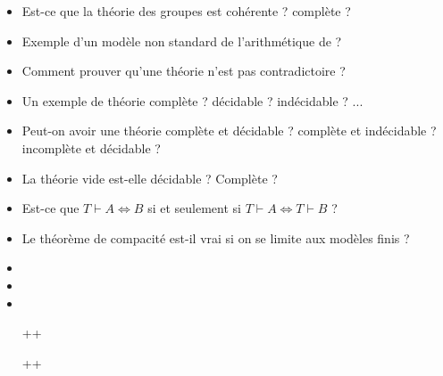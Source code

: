 \documentclass{agregfiche}
\begin{document}
\begin{itemize}
	\item Est-ce que la théorie des groupes est cohérente ? complète
	?
    \item Exemple d'un modèle non standard de l'arithmétique de
    ?
    \item Comment prouver qu'une théorie n'est pas contradictoire ?
    \item Un exemple de théorie complète ? décidable ? indécidable ?
    ...
    \item Peut-on avoir une théorie complète et décidable ? complète
    et indécidable ? incomplète et décidable ?
    \item La théorie vide est-elle décidable ? Complète ?
    \item  Est-ce que $T \vdash A \Leftrightarrow B$ si et seulement
    si $T
    \vdash A \Leftrightarrow T\vdash B$ ?
  \item Le théorème de compacité est-il vrai si on se limite aux modèles finis ?
\end{itemize}

\secreferences

\begin{itemize}
\item 
\item 
\item 

\end{itemize}

\secdev

\begin{itemize}
\item[++] 
\item[++] 
\end{itemize}
\end{document}
